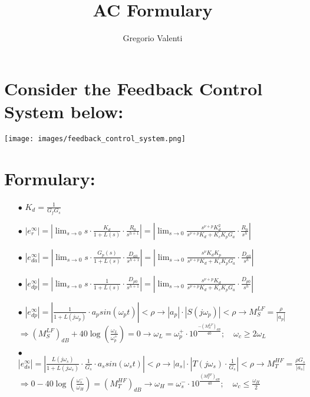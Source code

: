 \documentclass{article}
\title{AC Formulary}
\author{Gregorio Valenti}
\date{}
\begin{document}
	
	\section{Consider the Feedback Control System below:}
	\hspace{1cm}
	\texttt{[image: images/feedback\_control\_system.png]}
	
	\section{Formulary:}
	\begin{enumerate}
		\item[$\bullet$] $K_d = \frac{1}{G_f G_s}$
		
		\item[$\bullet$] $\left| e_r^\infty \right| = \left| \displaystyle\lim_{s\to0} s \cdot \frac{K_d}{1+L(s)} \cdot \frac{R_0}{s^{h+1}} \right| = \left| \displaystyle\lim_{s\to0} \frac{s^{\nu+p}K_d^2}{s^{\nu+p}K_d+K_cK_pG_a}  \cdot \frac{R_0}{s^{h}} \right|$
		
		\item[$\bullet$] $\left| e_{da}^\infty \right| = \left| \displaystyle\lim_{s\to0} s \cdot \frac{G_p(s)}{1+L(s)} \cdot \frac{D_{a0}}{s^{h+1}} \right| = \left| \displaystyle\lim_{s\to0} \frac{s^{\nu}K_dK_p}{s^{\nu+p}K_d+K_cK_pG_a}  \cdot \frac{D_{a0}}{s^{h}} \right|$
		
		\item[$\bullet$] $\left| e_{dp}^\infty \right| = \left| \displaystyle\lim_{s\to0} s \cdot \frac{1}{1+L(s)} \cdot \frac{D_{p0}}{s^{h+1}} \right| = \left| \displaystyle\lim_{s\to0} \frac{s^{\nu+p}K_d}{s^{\nu+p}K_d+K_cK_pG_a}  \cdot \frac{D_{p0}}{s^{h}} \right|$
		
		\item[$\bullet$] $\left| e_{dp}^\infty \right| = \left| 
		\frac{1}{1+L(j\omega_p)} \cdot a_p sin\left(\omega_pt\right) \right| < \rho \to \left| a_p \right| \cdot \left| S(j\omega_p) \right| < \rho \to
		M_S^{LF} = \frac{\rho}{\left| a_p \right|}$ \\
		$ \Rightarrow (M_S^{LF})_{dB} + 40 \log \left( \frac{\omega_L}{\omega_p^+} \right) = 0
		\to \omega_L = \omega_p^+ \cdot 10^{\frac{-(M_S^{LF})_{dB}}{40}}; \quad
		\omega_c \geq 2\omega_L$
		
		\item[$\bullet$] $\left| e_{ds}^\infty \right| = \left| 
		\frac{L(j\omega_s)}{1+L(j\omega_s)} \cdot \frac{1}{G_s} \cdot a_s sin\left(\omega_st\right) \right| < \rho \to \left| a_s \right| \cdot \left| T(j\omega_s) \cdot \frac{1}{G_s} \right| < \rho \to
		M_T^{HF} = \frac{\rho G_s}{\left| a_s \right|}$ \\
		$ \Rightarrow 0 - 40 \log \left( \frac{\omega_s^-}{\omega_H} \right) = (M_T^{HF})_{dB} \to \omega_H = \omega_s^- \cdot 10^{\frac{(M_T^{HF})_{dB}}{40}}; \quad
		\omega_c \leq \frac{\omega_H}{2}$
		

\end{enumerate}
\end{document}
